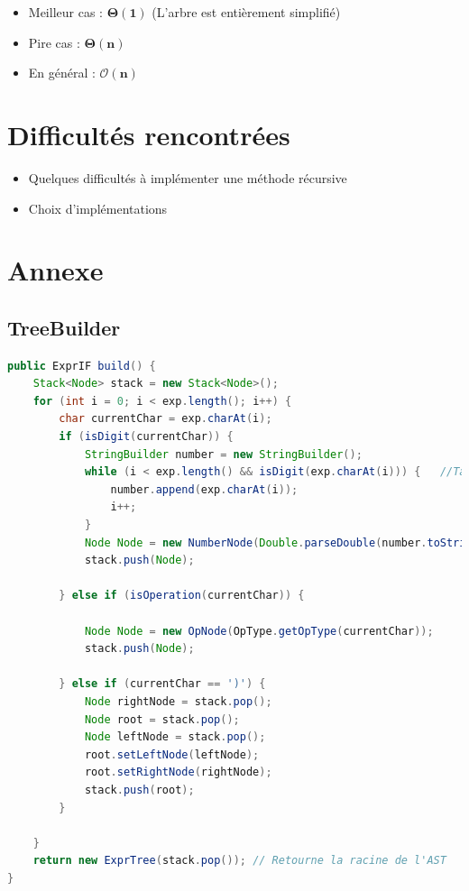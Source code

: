 \documentclass[12pt, a4paper, table]{article}
\begin{document}
\begin{itemize}
	\item Meilleur cas : $\mathbf{\Theta (1)}$ (L'arbre est entièrement simplifié)
	\item Pire cas : $\mathbf{\Theta(n)}$
	\item En général : $\mathbf{\mathcal{O}(n)}$
\end{itemize}


\section{Difficultés rencontrées}
\begin{itemize}
	\item Quelques difficultés à implémenter une méthode récursive
	\item Choix d'implémentations
\end{itemize}



\newpage
\section*{Annexe}

\subsection*{TreeBuilder}

\begin{lstlisting}[language=Java]
public ExprIF build() {
    Stack<Node> stack = new Stack<Node>();
    for (int i = 0; i < exp.length(); i++) {
        char currentChar = exp.charAt(i);
        if (isDigit(currentChar)) {
            StringBuilder number = new StringBuilder();
            while (i < exp.length() && isDigit(exp.charAt(i))) {   //Tant que le nombre n'est pas fini
                number.append(exp.charAt(i));
                i++;
            }
            Node Node = new NumberNode(Double.parseDouble(number.toString()));
            stack.push(Node);

        } else if (isOperation(currentChar)) {

            Node Node = new OpNode(OpType.getOpType(currentChar));
            stack.push(Node);

        } else if (currentChar == ')') {
            Node rightNode = stack.pop();
            Node root = stack.pop();
            Node leftNode = stack.pop();
            root.setLeftNode(leftNode);
            root.setRightNode(rightNode);
            stack.push(root);
        }

    }
    return new ExprTree(stack.pop()); // Retourne la racine de l'AST
}\end{lstlisting}
\medskip
\end{document}
